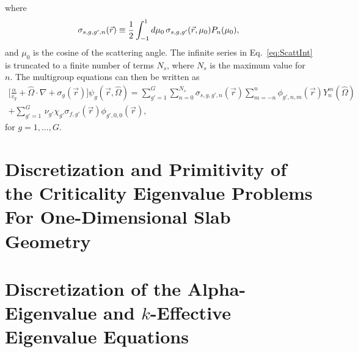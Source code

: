 where
\begin{equation}
	\sigma_{s,g,g',n}(\vec{r}) \equiv \frac{1}{2} \int_{-1}^{1} \mathop{}\!d \mu_{0} \, \sigma_{s,g,g'}(\vec{r},\mu_{0}) P_{n}(\mu_{0}),
\end{equation}
and $\mu_{0}$ is the cosine of the scattering angle. The infinite series in Eq.~\ref{eq:ScattInt} is truncated to a finite number of terms $N_{s}$, where $N_{s}$ is the maximum value for $n$. The multigroup equations can then be written as
\begin{multline}
	\bigg [ \frac{\alpha}{v_{g}} + \hat{\Omega} \cdot \nabla + \sigma_{g}(\vec{r}) \bigg ] \psi_{g}(\vec{r},\hat{\Omega}) = \sum_{g'=1}^{G} \sum_{n=0}^{N_{s}} \sigma_{s,g,g',n}(\vec{r}) \sum_{m=-n}^{n} \phi_{g',n,m}(\vec{r}) Y_{n}^{m}(\hat{\Omega}) \\ + \sum_{g'=1}^{G} \, \nu_{g'} \chi_{g'} \sigma_{f,g'}(\vec{r}) \phi_{g',0,0}(\vec{r}), 
	\label{eq:Alpha3DMGSPH}
\end{multline}
for $g = 1, \dots, G$.

%

\section{Discretization and Primitivity of the Criticality Eigenvalue Problems For One-Dimensional Slab Geometry}

\label{Discrete}

\section{Discretization of the Alpha-Eigenvalue and $k$-Effective Eigenvalue Equations}

